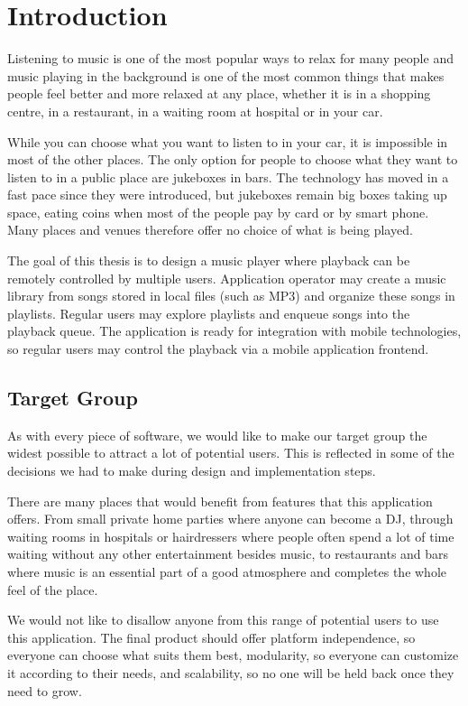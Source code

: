 \chapter*{Introduction}

Listening to music is one of the most popular ways to relax for many people and music playing in the background is one of the most common things that makes people feel better and more relaxed at any place, whether it is in a shopping centre, in a restaurant, in a waiting room at hospital or in your car.
\par
While you can choose what you want to listen to in your car, it is impossible in most of the other places. The only option for people to choose what they want to listen to in a public place are jukeboxes in bars. The technology has moved in a fast pace since they were introduced, but jukeboxes remain big boxes taking up space, eating coins when most of the people pay by card or by smart phone. Many places and venues therefore offer no choice of what is being played.
\par
The goal of this thesis is to design a music player where playback can be remotely controlled by multiple users. Application operator may create a music library from songs stored in local files (such as MP3) and organize these songs in playlists. Regular users may explore playlists and enqueue songs into the playback queue. The application is ready for integration with mobile technologies, so regular users may control the playback via a mobile application frontend.

\section*{Target Group}

As with every piece of software, we would like to make our target group the widest possible to attract a lot of potential users. This is reflected in some of the decisions we had to make during design and implementation steps.
\par
There are many places that would benefit from features that this application offers. From small private home parties where anyone can become a DJ, through waiting rooms in hospitals or hairdressers where people often spend a lot of time waiting without any other entertainment besides music, to restaurants and bars where music is an essential part of a good atmosphere and completes the whole feel of the place.
\par
We would not like to disallow anyone from this range of potential users to use this application. The final product should offer platform independence, so everyone can choose what suits them best, modularity, so everyone can customize it according to their needs, and scalability, so no one will be held back once they need to grow.

